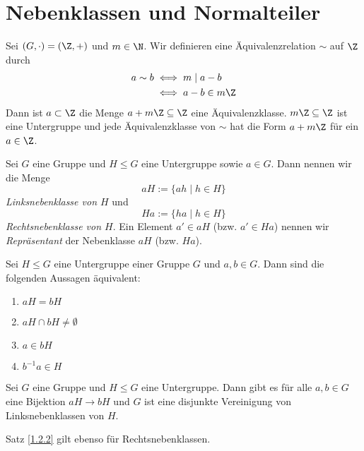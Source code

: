 \section{Nebenklassen und Normalteiler}\lecture

\begin{exmp*}
	Sei $ (G,\cdot)  = (\Z,+) $ und $m \in \N$. Wir definieren eine Äquivalenzrelation $\sim$ auf $\Z$ durch
	\begin{align*}
		a \sim b &\iff m \mid a-b\\
		&\iff a-b \in m\Z
	\end{align*}
	Dann ist $a \subset \Z$ die Menge $a+m\Z \subseteq \Z$ eine Äquivalenzklasse. $m\Z \subseteq \Z$ ist eine Untergruppe und jede Äquivalenzklasse von $\sim$ hat die Form $a+m\Z$ für ein $a \in \Z$.
\end{exmp*}

\begin{defn*}[Nebenklasse] 
	Sei $G$ eine Gruppe und $H \leq G$ eine Untergruppe sowie $a \in G$. Dann nennen wir die Menge
	\[ aH := \{ ah \mid h \in H\} \]
	\emph{Linksnebenklasse von $H$} und 
	\[ Ha := \{ha \mid h \in H\} \]
	\emph{Rechtsnebenklasse von $H$}. Ein Element $a' \in aH$ (bzw. $a' \in Ha$) nennen wir \emph{Repräsentant} der Nebenklasse $aH$ (bzw. $Ha$).
\end{defn*}

\begin{lem}
	Sei $ H \leq G $ eine Untergruppe einer Gruppe $G$ und $ a,b\in G $. Dann sind die folgenden Aussagen äquivalent:
	\begin{enumerate}[label={\roman*})]
		\item $aH = bH$
		\item $aH \cap bH \neq \emptyset$
		\item $a \in bH$
		\item $b^{-1}a \in H$
	\end{enumerate}
\end{lem}

\begin{thm}\label{1.2.2}
	Sei $G$ eine Gruppe und $H \leq G$ eine Untergruppe. Dann gibt es für alle $a,b \in G$ eine Bijektion $aH \to bH$ und $G$ ist eine disjunkte Vereinigung von Linksnebenklassen von $H$.
\end{thm}

\begin{rem*}
	Satz \ref{1.2.2} gilt ebenso für Rechtsnebenklassen.
\end{rem*}

